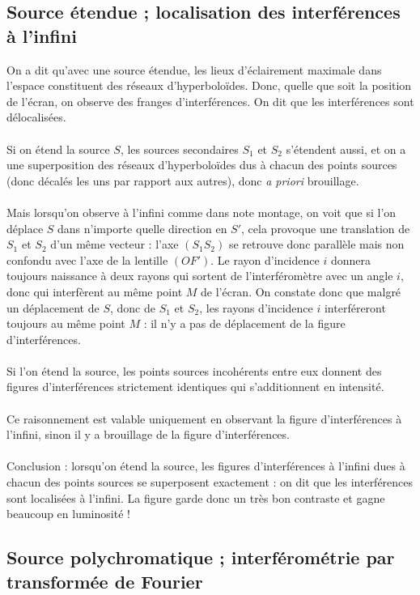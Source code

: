 \documentclass[french]{book}
\theoremstyle{plain}
\theoremstyle{definition}
\theoremstyle{remark}
\begin{document}
\subsection{Source étendue ; localisation des interférences à l'infini}
On a dit qu'avec une source étendue, les lieux d'éclairement maximale dans l'espace constituent des réseaux d'hyperboloïdes. Donc, quelle que soit la position de l'écran, on observe des franges d'interférences. On dit que les interférences sont délocalisées. \\ \\ Si on étend la source $S$, les sources secondaires $S_1$ et $S_2$ s'étendent aussi, et on a une superposition des réseaux d'hyperboloïdes dus à chacun des points sources (donc décalés les uns par rapport aux autres), donc \textit{a priori} brouillage. \\ \\ Mais lorsqu'on observe à l'infini comme dans note montage, on voit que si l'on déplace $S$ dans n'importe quelle direction en $S'$, cela provoque une translation de $S_1$ et $S_2$ d'un même vecteur : l'axe $(S_1S_2)$ se retrouve donc parallèle mais non confondu avec l'axe de la lentille $(OF')$. Le rayon d'incidence $i$ donnera toujours naissance à deux rayons qui sortent de l'interféromètre avec un angle $i$, donc qui interfèrent au même point $M$ de l'écran. On constate donc que malgré un déplacement de $S$, donc de $S_1$ et $S_2$, les rayons d'incidence $i$ interféreront toujours au même point $M$ : il n'y a pas de déplacement de la figure d'interférences. \\ \\ Si l'on étend la source, les points sources incohérents entre eux donnent des figures d'interférences strictement identiques qui s'additionnent en intensité. \\ \\ Ce raisonnement  est valable uniquement en observant la figure d'interférences à l'infini, sinon il y a brouillage de la figure d'interférences. \\ \\ Conclusion : lorsqu'on étend la source, les figures d'interférences à l'infini dues à chacun des points sources se superposent exactement : on dit que les interférences sont localisées à l'infini. La figure garde donc un très bon contraste et gagne beaucoup en luminosité !
\subsection{Source polychromatique ; interférométrie par transformée de Fourier}
\end{document}
